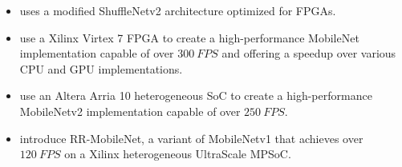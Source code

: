 \documentclass[12pt,letterpaper,english]{article}
\newcommand{\citework}[1]{\citeauthor{#1} \autocite{#1}}
\begin{document}
\begin{itemize}
	\item {} \autocite{synetgy} uses a modified
	ShuffleNetv2 \autocite{shufflenetv2} architecture optimized for FPGAs.
	\item \citework{mobilenet2021fpga} use a Xilinx Virtex 7 FPGA to create a
	high-performance MobileNet implementation capable of over $\SI{300}{FPS}$
	and offering a speedup over various CPU and GPU implementations.
	\item \citework{mobilenet2018fpga} use an Altera Arria 10 heterogeneous SoC
	to create a high-performance MobileNetv2 implementation capable of over
	$\SI{250}{FPS}$.
	\item \citework{mobilenet2018rr} introduce RR-MobileNet, a variant of
	MobileNetv1 that achieves over $\SI{120}{FPS}$ on a Xilinx heterogeneous
	UltraScale MPSoC.
\end{itemize}


\newpage
\printbibliography
\end{document}
